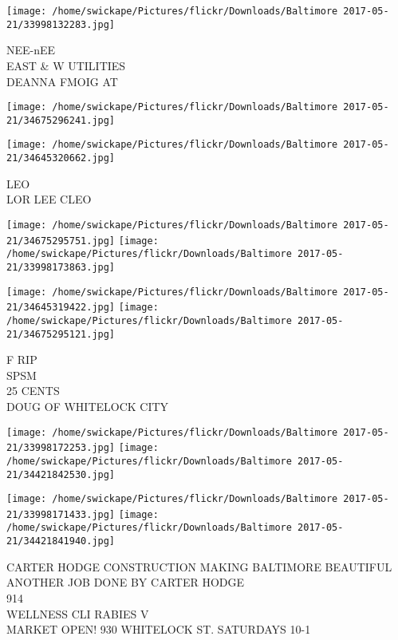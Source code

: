 \documentclass[10pt,letterpaper]{article}
\begin{document}
\vspace{0.25in}
\texttt{[image: /home/swickape/Pictures/flickr/Downloads/Baltimore 2017-05-21/33998132283.jpg]}

NEE{-}nEE\\
EAST \& W UTILITIES\\
DEANNA FMOIG AT\\
\pagebreak

\texttt{[image: /home/swickape/Pictures/flickr/Downloads/Baltimore 2017-05-21/34675296241.jpg]}

\vspace{0.25in}
\texttt{[image: /home/swickape/Pictures/flickr/Downloads/Baltimore 2017-05-21/34645320662.jpg]}

LEO\\
LOR LEE CLEO\\
\pagebreak

\texttt{[image: /home/swickape/Pictures/flickr/Downloads/Baltimore 2017-05-21/34675295751.jpg]}
\texttt{[image: /home/swickape/Pictures/flickr/Downloads/Baltimore 2017-05-21/33998173863.jpg]}

\texttt{[image: /home/swickape/Pictures/flickr/Downloads/Baltimore 2017-05-21/34645319422.jpg]}
\texttt{[image: /home/swickape/Pictures/flickr/Downloads/Baltimore 2017-05-21/34675295121.jpg]}

F RIP\\
SPSM\\
25 CENTS\\
DOUG OF WHITELOCK CITY\\
\pagebreak

\texttt{[image: /home/swickape/Pictures/flickr/Downloads/Baltimore 2017-05-21/33998172253.jpg]}
\texttt{[image: /home/swickape/Pictures/flickr/Downloads/Baltimore 2017-05-21/34421842530.jpg]}

\texttt{[image: /home/swickape/Pictures/flickr/Downloads/Baltimore 2017-05-21/33998171433.jpg]}
\texttt{[image: /home/swickape/Pictures/flickr/Downloads/Baltimore 2017-05-21/34421841940.jpg]}

CARTER HODGE CONSTRUCTION MAKING BALTIMORE BEAUTIFUL ANOTHER JOB DONE BY CARTER HODGE\\
914\\
WELLNESS CLI RABIES V\\
MARKET OPEN! 930 WHITELOCK ST. SATURDAYS 10{-}1\\
\pagebreak
\end{document}
